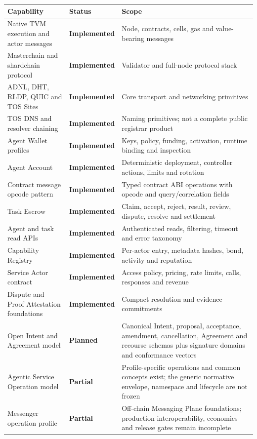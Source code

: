 \documentclass[11pt,oneside]{article}
\newcommand{\implemented}{\textbf{Implemented}}
\newcommand{\planned}{\textbf{Planned}}
\newcommand{\partialstatus}{\textbf{Partial}}
\begin{document}
\begin{longtable}{L{0.34\textwidth}L{0.17\textwidth}L{0.38\textwidth}}
\toprule
Capability & Status & Scope \\
\midrule
\endhead
Native TVM execution and actor messages &
\implemented &
Node, contracts, cells, gas and value-bearing messages \\
Masterchain and shardchain protocol &
\implemented &
Validator and full-node protocol stack \\
ADNL, DHT, RLDP, QUIC and TOS Sites &
\implemented &
Core transport and networking primitives \\
TOS DNS and resolver chaining &
\implemented &
Naming primitives; not a complete public registrar product \\
Agent Wallet profiles &
\implemented &
Keys, policy, funding, activation, runtime binding and inspection \\
Agent Account &
\implemented &
Deterministic deployment, controller actions, limits and rotation \\
Contract message opcode pattern &
\implemented &
Typed contract ABI operations with opcode and query/correlation fields \\
Task Escrow &
\implemented &
Claim, accept, reject, result, review, dispute, resolve and settlement \\
Agent and task read APIs &
\implemented &
Authenticated reads, filtering, timeout and error taxonomy \\
Capability Registry &
\implemented &
Per-actor entry, metadata hashes, bond, activity and reputation \\
Service Actor contract &
\implemented &
Access policy, pricing, rate limits, calls, responses and revenue \\
Dispute and Proof Attestation foundations &
\implemented &
Compact resolution and evidence commitments \\
Open Intent and Agreement model &
\planned &
Canonical Intent, proposal, acceptance, amendment, cancellation, Agreement and recourse
schemas plus signature domains and conformance vectors \\
Agentic Service Operation model &
\partialstatus &
Profile-specific operations and common concepts exist; the generic normative envelope,
namespace and lifecycle are not frozen \\
Messenger operation profile &
\partialstatus &
Off-chain Messaging Plane foundations; production interoperability, economics and release
gates remain incomplete \\

\end{longtable}
\end{document}
